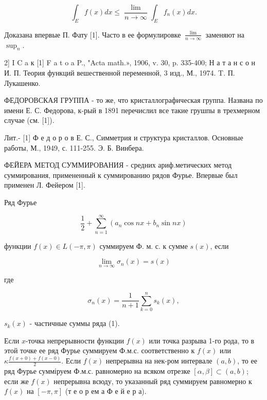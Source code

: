 \documentclass[10pt]{article}
\begin{document}
\[

\int_{E} f(x) d x \leqslant \frac{\lim }{n \rightarrow \infty} \int_{E} f_{n}(x) d x .

\]



Доказана впервые П. Фату [1]. Часто в ее формулировке $\frac{\lim }{n \rightarrow \infty}$ заменяют на $\sup _{n}$.



2] I C a к [1] F a t o a P., "Acta math.», 1906, v. 30, p. 335-400; Н а т а н с о н И. П. Теория функций вешественной переменной, 3 изд., М., 1974. T. П. Лукашенко.



ФЕДОРОВСКАЯ ГРУППА - то же, что кристаллографическая группа. Названа по имени Е. С. Федорова, к-рый в 1891 перечислил все такие грушпы в трехмерном случае (см. [1]).



Лит.- [1] Ф е д о р о в Е. С., Симметрия и структура кристаллов. Основные работы, М., 1949, с. 111-255. Э. Б. Винбера.



ФЕЙЕРА МЕТОД СУММИРОВАНИЯ - средних ариф.метических метод суммирования, примененный к суммированию рядов Фурье. Впервые был применен Л. Фейером [1].



Ряд Фурье



\[

\frac{1}{2}+\sum_{n=1}^{\infty}\left(a_{n} \cos n x+b_{n} \sin n x\right)

\]



функции $f(x) \in L(-\pi, \pi)$ суммируем Ф. м. с. к сумме $s(x)$, если



\[

\lim _{n \rightarrow \infty} \sigma_{n}(x)=s(x)

\]



где



\[

\sigma_{n}(x)=\frac{1}{n+1} \sum_{k=0}^{n} s_{k}(x),

\]



$s_{k}(x)$ - частичные суммы ряда (1).



Если $x$-точка непрерывности функции $f(x)$ или точка разрыва 1-го рода, то в этой точке ее ряд Фурье суммируем Ф.м.с. соответственно к $f(x)$ или $\kappa \frac{f(x+0)+f(x-0)}{2}$. Если $f(x)$ непрерывна на нек-ром интервале $(a, b)$, то ее ряд Фурье сумміруем Ф.м.с. равномерно на всяком отрезке $[\alpha, \beta] \subset(a, b)$; если же $f(x)$ непрерывна всюду, то указанный ряд суммируем равномерно к $f(x)$ на $[-\pi, \pi]$ (т е о р ем а Ф е й е р а).
\end{document}
